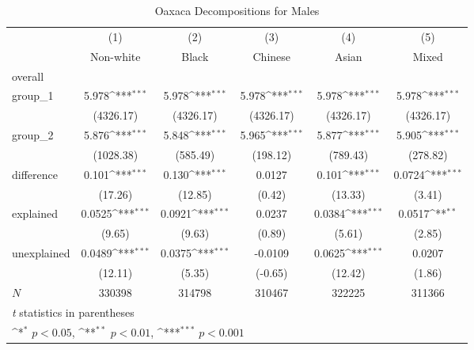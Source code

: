 \begin{table}[htbp]\centering
\def\sym#1{\ifmmode^{#1}\else\(^{#1}\)\fi}
\caption{Oaxaca Decompositions for Males\label{tab1}}
\begin{tabular}{l*{5}{c}}
\hline\hline
            &\multicolumn{1}{c}{(1)}&\multicolumn{1}{c}{(2)}&\multicolumn{1}{c}{(3)}&\multicolumn{1}{c}{(4)}&\multicolumn{1}{c}{(5)}\\
            &\multicolumn{1}{c}{Non-white}&\multicolumn{1}{c}{Black}&\multicolumn{1}{c}{Chinese}&\multicolumn{1}{c}{Asian}&\multicolumn{1}{c}{Mixed}\\
\hline
overall     &                     &                     &                     &                     &                     \\
group\_1     &       5.978\sym{***}&       5.978\sym{***}&       5.978\sym{***}&       5.978\sym{***}&       5.978\sym{***}\\
            &   (4326.17)         &   (4326.17)         &   (4326.17)         &   (4326.17)         &   (4326.17)         \\
group\_2     &       5.876\sym{***}&       5.848\sym{***}&       5.965\sym{***}&       5.877\sym{***}&       5.905\sym{***}\\
            &   (1028.38)         &    (585.49)         &    (198.12)         &    (789.43)         &    (278.82)         \\
difference  &       0.101\sym{***}&       0.130\sym{***}&      0.0127         &       0.101\sym{***}&      0.0724\sym{***}\\
            &     (17.26)         &     (12.85)         &      (0.42)         &     (13.33)         &      (3.41)         \\
explained   &      0.0525\sym{***}&      0.0921\sym{***}&      0.0237         &      0.0384\sym{***}&      0.0517\sym{**} \\
            &      (9.65)         &      (9.63)         &      (0.89)         &      (5.61)         &      (2.85)         \\
unexplained &      0.0489\sym{***}&      0.0375\sym{***}&     -0.0109         &      0.0625\sym{***}&      0.0207         \\
            &     (12.11)         &      (5.35)         &     (-0.65)         &     (12.42)         &      (1.86)         \\
\hline
\(N\)       &      330398         &      314798         &      310467         &      322225         &      311366         \\
\hline\hline
\multicolumn{6}{l}{\footnotesize \textit{t} statistics in parentheses}\\
\multicolumn{6}{l}{\footnotesize \sym{*} \(p<0.05\), \sym{**} \(p<0.01\), \sym{***} \(p<0.001\)}\\
\end{tabular}
\label{tab:oaxaca_male_summary}
\end{table}
